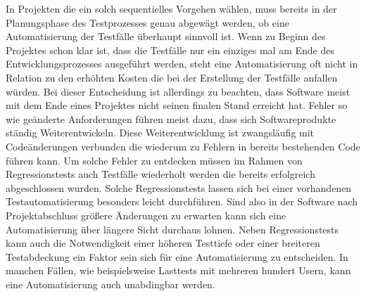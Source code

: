 In Projekten die ein solch sequentielles Vorgehen wählen, muss bereits in der Planungsphase des Testprozesses genau abgewägt werden, ob eine Automatisierung der Testfälle überhaupt sinnvoll ist.
Wenn zu Beginn des Projektes schon klar ist, dass die Testfälle nur ein einziges mal am Ende des Entwicklungsprozesses ausgeführt werden, steht eine Automatisierung oft nicht in Relation zu den erhöhten Kosten die bei der Erstellung der Testfälle anfallen würden.
Bei dieser Entscheidung ist allerdings zu beachten, dass Software meist mit dem Ende eines Projektes nicht seinen finalen Stand erreicht hat. Fehler so wie geänderte Anforderungen führen meist dazu, dass sich Softwareprodukte ständig Weiterentwickeln.
Diese Weiterentwicklung ist zwangsläufig mit Codeänderungen verbunden die wiederum zu Fehlern in bereits bestehenden Code führen kann.
Um solche Fehler zu entdecken müssen im Rahmen von Regressionstests auch Testfälle wiederholt werden die bereits erfolgreich abgeschlossen wurden.
Solche Regressionstests lassen sich bei einer vorhandenen Testautomatisierung besonders leicht durchführen. Sind also in der Software nach Projektabschluss größere Änderungen zu erwarten kann sich eine Automatisierung über längere Sicht durchaus lohnen.
Neben Regressionstests kann auch die Notwendigkeit einer höheren Testtiefe oder einer breiteren Testabdeckung ein Faktor sein sich für eine Automatisierung zu entscheiden.
In manchen Fällen, wie beispielsweise Lasttests mit mehreren hundert Usern, kann eine Automatisierung auch unabdingbar werden.

